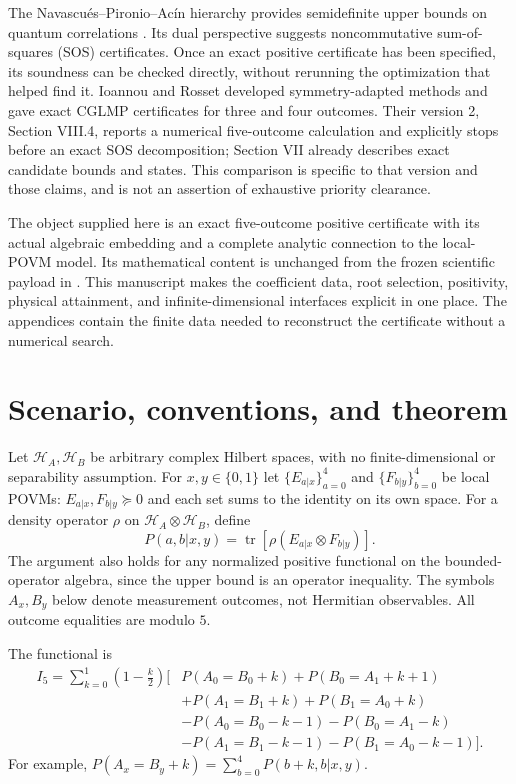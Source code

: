 \documentclass[11pt,a4paper]{article}
\numberwithin{equation}{section}
\theoremstyle{remark}\newtheorem{remark}[theorem]{Remark}
\newcommand{\HH}{\mathcal H}
\newcommand{\tr}{\operatorname{tr}}
\begin{document}
The Navascu\'es--Pironio--Ac\'in hierarchy provides semidefinite upper bounds
on quantum correlations \cite{NPA2007,NPA2008}. Its dual perspective suggests
noncommutative sum-of-squares (SOS) certificates. Once an exact positive
certificate has been specified, its soundness can be checked directly, without
rerunning the optimization that helped find it. Ioannou and Rosset
\cite{IoannouRosset} developed symmetry-adapted methods and gave exact CGLMP
certificates for three and four outcomes. Their version 2, Section VIII.4,
reports a numerical five-outcome calculation and explicitly stops before an
exact SOS decomposition; Section VII already describes exact candidate
bounds and states. This comparison is specific to that version and those
claims, and is not an assertion of exhaustive priority clearance.

The object supplied here is an exact five-outcome positive certificate with
its actual algebraic embedding and a complete analytic connection to the
local-POVM model. Its mathematical content is unchanged from the frozen
scientific payload in \cite{Artifact}. This manuscript makes the coefficient
data, root selection, positivity, physical attainment, and infinite-dimensional
interfaces explicit in one place. The appendices contain the finite data
needed to reconstruct the certificate without a numerical search.

\section{Scenario, conventions, and theorem}\label{sec:theorem}
Let $\HH_A,\HH_B$ be arbitrary complex Hilbert spaces, with no finite-dimensional
or separability assumption. For $x,y\in\{0,1\}$ let
$\{E_{a|x}\}_{a=0}^4$ and $\{F_{b|y}\}_{b=0}^4$ be local POVMs:
$E_{a|x},F_{b|y}\succeq0$ and each set sums to the identity on its own space.
For a density operator $\rho$ on $\HH_A\otimes\HH_B$, define
\begin{equation}
 P(a,b|x,y)=\tr\!\left[\rho(E_{a|x}\otimes F_{b|y})\right].
\end{equation}
The argument also holds for any normalized positive functional on the
bounded-operator algebra, since the upper bound is an operator inequality.
The symbols $A_x,B_y$ below denote measurement outcomes, not Hermitian
observables. All outcome equalities are modulo $5$.

The functional is
\begin{equation}\label{eq:cglmp}
\begin{aligned}
 I_5=\sum_{k=0}^{1}\left(1-\frac{k}{2}\right)\big[&
 P(A_0=B_0+k)+P(B_0=A_1+k+1)\\
 &+P(A_1=B_1+k)+P(B_1=A_0+k)\\
 &-P(A_0=B_0-k-1)-P(B_0=A_1-k)\\
 &-P(A_1=B_1-k-1)-P(B_1=A_0-k-1)\big].
\end{aligned}
\end{equation}
For example, $P(A_x=B_y+k)=\sum_{b=0}^4P(b+k,b|x,y)$.
\end{document}
